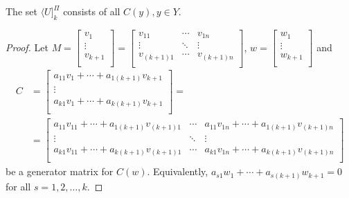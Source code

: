\documentclass[10pt,a4paper]{amsart}
\begin{document}
 \begin{lemma}\label{ukpi}
   The set $\langle U]^{\Pi}_{k}$ consists of all $C(y), y\in Y$.
 \end{lemma}

 \begin{proof}
   Let $M=\left[
\begin{array}{cccc}
v_1\\
\vdots\\
v_{k+1}\\
\end{array}
\right]=\left[
\begin{array}{cccc}
v_{11}& \cdots &v_{1n}\\
\vdots&\ddots&\vdots\\
v_{(k+1)1}& \cdots &v_{(k+1)n}\\
\end{array}
\right]$, $w=\left[
\begin{array}{cccc}
w_1\\
\vdots\\
w_{k+1}\\
\end{array}
\right]$ and \begin{align*}
C&=\left[\begin{array}{c}
a_{11}v_{1}+ \cdots +a_{1(k+1)}v_{k+1}\\
\vdots\\
a_{k1}v_{1}+ \cdots +a_{k(k+1)}v_{k+1}\\
\end{array}
\right]=\\
              &=\left[\begin{array}{ccc}
a_{11}v_{11}+ \cdots +a_{1(k+1)}v_{(k+1)1}& \cdots &a_{11}v_{1n}+ \cdots +a_{1(k+1)}v_{(k+1)n}\\
\vdots&\ddots&\vdots\\
a_{k1}v_{11}+ \cdots +a_{k(k+1)}v_{(k+1)1}& \cdots &a_{k1}v_{1n}+ \cdots +a_{k(k+1)}v_{(k+1)n}\\
\end{array}
\right]      \end{align*} be a generator matrix for $C(w)$. Equivalently, $
a_{s1}w_{1}+ \cdots +a_{s(k+1)}w_{k+1}=0$ for all $s=1,2, \dots, k$.


\end{proof}
\end{document}
